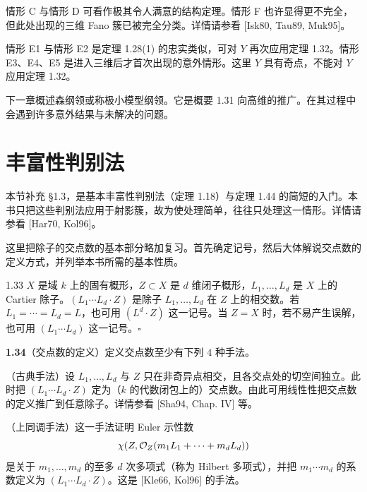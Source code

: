 
情形 C 与情形 D 可看作极其令人满意的结构定理。情形 F 也许显得更不完全，但此处出现的三维 Fano 簇已被完全分类。详情请参看 [Isk80, Tau89, Muk95]。

情形 E1 与情形 E2 是定理 1.28(1) 的忠实类似，可对 $Y$ 再次应用定理 1.32。情形 E3、E4、E5 是进入三维后才首次出现的意外情形。这里 $Y$ 具有奇点，不能对 $Y$ 应用定理 1.32。

下一章概述森纲领或称极小模型纲领。它是概要 1.31 向高维的推广。在其过程中会遇到许多意外结果与未解决的问题。

\section{丰富性判别法}


本节补充 §1.3，是基本丰富性判别法（定理 1.18）与定理 1.44 的简短的入门。本书只把这些判别法应用于射影簇，故为使处理简单，往往只处理这一情形。详情请参看 [Har70, Kol96]。

这里把除子的交点数的基本部分略加复习。首先确定记号，然后大体解说交点数的定义方式，并列举本书所需的基本性质。

\begin{notation}{1.33}
$X$ 是域 $k$ 上的固有概形，$Z\subset X$ 是 $d$ 维闭子概形，$L_1,\dots,L_d$ 是 $X$ 上的 Cartier 除子。$(L_1\cdots L_d\cdot Z)$ 是除子 $L_1,\dots,L_d$ 在 $Z$ 上的相交数。若 $L_1=\cdots=L_d=L$，也可用 $(L^d\cdot Z)$ 这一记号。当 $Z=X$ 时，若不易产生误解，也可用 $(L_1\cdots L_d)$ 这一记号。\hfill$\square$
\end{notation}

\par\medskip\noindent\textbf{1.34}（交点数的定义）\quad 定义交点数至少有下列 $4$ 种手法。

（古典手法）设 $L_1,\dots,L_d$ 与 $Z$ 只在非奇异点相交，且各交点处的切空间独立。此时把 $(L_1\cdots L_d\cdot Z)$ 定为（$k$ 的代数闭包上的）交点数。由此可用线性性把交点数的定义推广到任意除子。详情参看 [Sha94, Chap. IV] 等。

（上同调手法）这一手法证明 Euler 示性数
\[ \chi(Z,\mathcal{O}_Z(m_1L_1+\cdots+m_dL_d)) \]
是关于 $m_1,\dots,m_d$ 的至多 $d$ 次多项式（称为 Hilbert 多项式），并把 $m_1\cdots m_d$ 的系数定义为 $(L_1\cdots L_d\cdot Z)$。这是 [Kle66, Kol96] 的手法。

